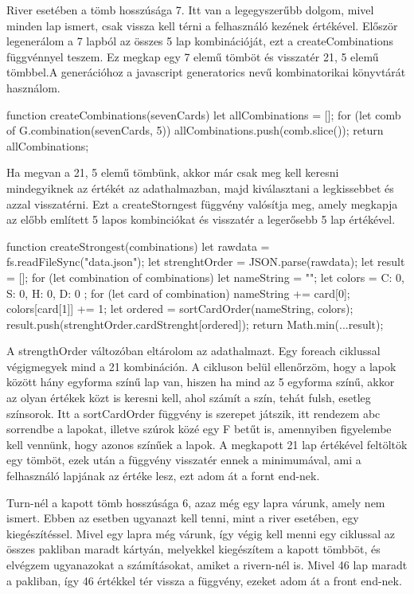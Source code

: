 River esetében a tömb hosszúsága 7. Itt van a legegyszerűbb dolgom, mivel minden lap ismert, csak vissza kell térni a felhasználó kezének értékével. Először legenerálom a 7 lapból az összes 5 lap kombinációját, ezt a createCombinations függvénnyel teszem. Ez megkap egy 7 elemű tömböt és visszatér 21, 5 elemű tömbbel.A generációhoz a javascript generatorics nevű kombinatorikai könyvtárát használom.

\begin{python}
function createCombinations(sevenCards) {
  let allCombinations = [];
  for (let comb of G.combination(sevenCards, 5)) {
    allCombinations.push(comb.slice());
  }
  return allCombinations;
}
\end{python}

Ha megvan a 21, 5 elemű tömbünk, akkor már csak meg kell keresni mindegyiknek az értékét az adathalmazban, majd kiválasztani a legkissebbet és azzal visszatérni. Ezt a createStorngest függvény valósítja meg, amely megkapja az előbb említett 5 lapos kombinciókat és visszatér a legerősebb 5 lap értékével.

\begin{python}
function createStrongest(combinations){
  let rawdata = fs.readFileSync("data.json");
  let strenghtOrder = JSON.parse(rawdata);
  let result =  [];
  for (let combination of combinations) {
    let nameString = "";
    let colors = { C: 0, S: 0, H: 0, D: 0 };
    for (let card of combination) {
      nameString += card[0];
      colors[card[1]] += 1;
    }
    let ordered = sortCardOrder(nameString, colors);
    result.push(strenghtOrder.cardStrenght[ordered]);
  }
  return Math.min(...result);
}
\end{python}

A strengthOrder változóban eltárolom az adathalmazt. Egy foreach ciklussal végigmegyek mind a 21 kombináción. A cikluson belül ellenőrzöm, hogy a lapok között hány egyforma színű lap van, hiszen ha mind az 5 egyforma színű, akkor az olyan értékek közt is keresni kell, ahol számít a szín, tehát fulsh, esetleg színsorok. Itt a sortCardOrder függvény is szerepet játszik, itt rendezem abc sorrendbe a lapokat, illetve szúrok közé egy F betűt is, amennyiben figyelembe kell vennünk, hogy azonos színűek a lapok. A megkapott 21 lap értékével feltöltök egy tömböt, ezek után a függvény visszatér ennek a minimumával, ami a felhasználó lapjának az értéke lesz, ezt adom át a fornt end-nek.

Turn-nél a kapott tömb hosszúsága 6, azaz még egy lapra várunk, amely nem ismert. Ebben az esetben ugyanazt kell tenni, mint a river esetében, egy kiegészítéssel. Mivel egy lapra még várunk, így végig kell menni egy ciklussal az összes pakliban maradt kártyán, melyekkel kiegészítem a kapott tömbböt, és elvégzem ugyanazokat a számításokat, amiket a rivern-nél is. Mivel 46 lap maradt a pakliban, így 46 értékkel tér vissza a függvény, ezeket adom át a front end-nek.

